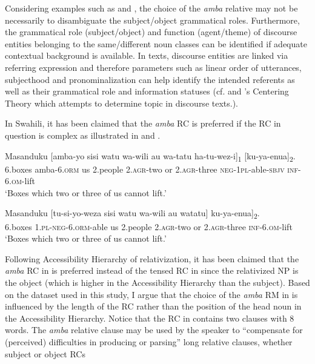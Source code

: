 \documentclass[output=paper,colorlinks,citecolor=brown]{langscibook}
\begin{document}
Considering examples such as  and , the choice of the \textit{amba} relative may not be necessarily to disambiguate the subject/object grammatical roles. Furthermore, the grammatical role (subject/object) and function (agent/theme) of discourse entities belonging to the same/different noun classes can be identified if adequate contextual background is available. In texts, discourse entities are linked via referring expression and therefore parameters such as linear order of utterances, subjecthood and pronominalization can help identify the intended referents as well as their grammatical role and information statuses (cf. \citealt{GroszEtAl1995} and \citeauthor{GroszSidner1998}'s \citeyear{GroszSidner1998} Centering Theory which attempts to determine topic in discourse texts.).

In Swahili, it has been claimed that the \textit{amba} RC is preferred if the RC in question is complex as illustrated in  and .

\ea%
    \label{ex:mwamzandi:12}
    \gll    Masanduku  [amba-yo sisi watu wa-wili au wa-tatu ha-tu-wez-i]\textsubscript{1} [ku-ya-enua]\textsubscript{2}.\\
            6.boxes  amba\textsc{-6.orm} us 2.people \textsc{2.agr-}two or \textsc{2.agr-}three  \textsc{neg-1pl-}able\textsc{-sbjv} \textsc{inf-6.om-}lift\\
    \glt    ‘Boxes which two or three of us cannot lift.’
\z

\ea%
    \label{ex:mwamzandi:13}
    \gll    Masanduku [tu-si-yo-weza sisi watu wa-wili au watatu] ku-ya-enua]\textsubscript{2}.\\
            6.boxes  \textsc{1.pl-neg-6.orm-}able us 2.people \textsc{2.agr-}two or \textsc{2.agr-}three \textsc{inf-6.om-}lift\\
    \glt    ‘Boxes which two or three of us cannot lift.’ \hfill \citep[310]{Ashton1944}
\z

Following  Accessibility Hierarchy of relativization, it has been claimed that the \textit{amba} RC in  is preferred  instead of the tensed RC in  since the relativized NP is the object (which is higher in the Accessibility Hierarchy than the subject). Based on the dataset used in this study, I argue that the choice of the \textit{amba} RM in  is influenced by the length of the RC rather than the position of the head noun in the Accessibility Hierarchy. Notice that the RC in  contains two clauses with 8 words. The \textit{amba} relative clause may be used by the speaker to “compensate for (perceived) difficulties in producing or parsing” long relative clauses, whether subject or object RCs \citep[133]{Green2008}
\end{document}

